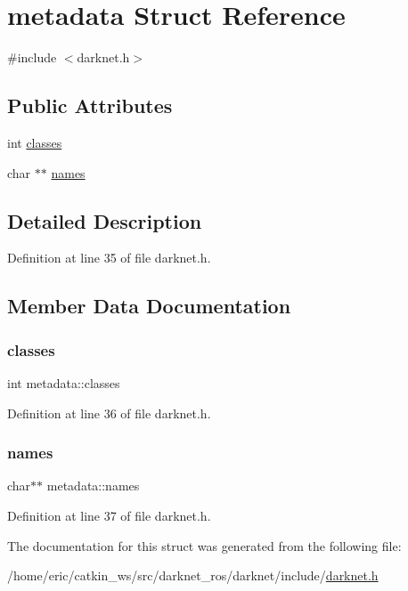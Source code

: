 \hypertarget{structmetadata}{}\section{metadata Struct Reference}
\label{structmetadata}


{\ttfamily \#include $<$darknet.\+h$>$}

\subsection*{Public Attributes}
\begin{DoxyCompactItemize}
\item 
int \mbox{\hyperlink{structmetadata_a79e09a60e76b3658018e342933715f69}{classes}}
\item 
char $\ast$$\ast$ \mbox{\hyperlink{structmetadata_aee443b3a2259ad9031259d20ddf79086}{names}}
\end{DoxyCompactItemize}


\subsection{Detailed Description}


Definition at line 35 of file darknet.\+h.



\subsection{Member Data Documentation}
\mbox{\label{structmetadata_a79e09a60e76b3658018e342933715f69}} 
\subsubsection{\texorpdfstring{classes}{classes}}
{\footnotesize\ttfamily int metadata\+::classes}



Definition at line 36 of file darknet.\+h.

\mbox{\label{structmetadata_aee443b3a2259ad9031259d20ddf79086}} 
\subsubsection{\texorpdfstring{names}{names}}
{\footnotesize\ttfamily char$\ast$$\ast$ metadata\+::names}



Definition at line 37 of file darknet.\+h.



The documentation for this struct was generated from the following file\+:\begin{DoxyCompactItemize}
\item 
/home/eric/catkin\+\_\+ws/src/darknet\+\_\+ros/darknet/include/\mbox{\hyperlink{darknet_8h}{darknet.\+h}}\end{DoxyCompactItemize}
